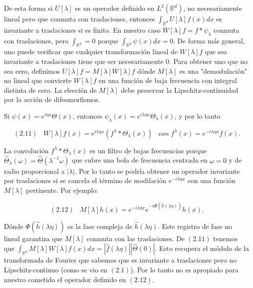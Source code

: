 \medskip

\noindent De esta forma si $U[\lambda]$ es un operador definido en $L^2(\mathbb{R}^d)$, no necesariamente lineal pero que conmuta con traslaciones, entonces $\int_{\mathbb{R}^d} U[\lambda]f(x)dx$ es invariante a traslaciones si es finito. En nuestro caso $W[\lambda]f=f\ast\psi_\lambda$ conmuta con traslaciones, pero $\int_{\mathbb{R}^d}=0$ porque $\int_{\mathbb{R}^d} \psi(x)dx=0$. De forma más general, uno puede verificar que cualquier transformación lineal de $W[\lambda]f$ que sea invariante a traslaciones tiene que ser necesariamente $0$. Para obtener uno que no sea cero, definimos $U[\lambda]f=M[\lambda]W[\lambda]f$ dónde $M[\lambda]$ es una "demodulación" no lineal que convierte $W[\lambda]f$ en una función de baja frecuencia con integral distinta de cero. La elección de $M[\lambda]$ debe preservar la Lipschitz-continuidad por la acción de difeomorfismos.

\medskip

\noindent Si $\psi(x)=e^{i\eta x}\Theta(x)$, entonces $\psi_\lambda(x)=e^{i\lambda\eta x}\Theta_\lambda(x)$, y por lo tanto 

$$(2.11) \; \; \; W[\lambda]f(x)=e^{i\lambda\eta x}(f^\lambda \ast \Theta_\lambda(x)) \; \; \; con \; f^\lambda(x)=e^{-i\lambda\eta x}f(x).$$

\noindent La convolución $f^\lambda \ast \Theta_\lambda(x)$ es un filtro de bajas frecuencias porque $\widehat{\Theta}_\lambda(\omega)=\widehat{\Theta}(\lambda^{-1} \omega)$ que cubre una bola de frecuencia centrada en $\omega=0$ y de radio proporcional a $|\lambda|$. Por lo tanto se podría obtener un operador invariante por traslaciones si se cancela el término de modilación $e^{-i\lambda\eta x}$ con una función $M[\lambda]$ pertinente. Por ejemplo: 

$$(2.12) \;\;\; M[\lambda]h(x)=e^{-i\lambda\eta x} e^{-i \Phi(\widehat{h}(\lambda\eta))}h(x).$$

\noindent Dónde $\Phi(\widehat{h}(\lambda\eta))$ es la fase compleja de $\widehat{h}(\lambda\eta)$. Este registro de fase no lineal garantiza que $M[\lambda]$ conmuta con las traslaciones. De $(2.11)$ tenemos que $\int_{\mathbb{R}^d}M[\lambda]W[\lambda]f(x)dx=|\widehat{f}(\lambda \eta)||\widehat{\Theta}(0)|$. Esto recupera el módulo de la transformada de Fourier que sabemos que es invariante a traslaciones pero no Lipschitz-continuo (como se vio en $(2.1)$). Por lo tanto no es apropiado para nuestro cometido el operador definido en $(2.12)$. 

\medskip

